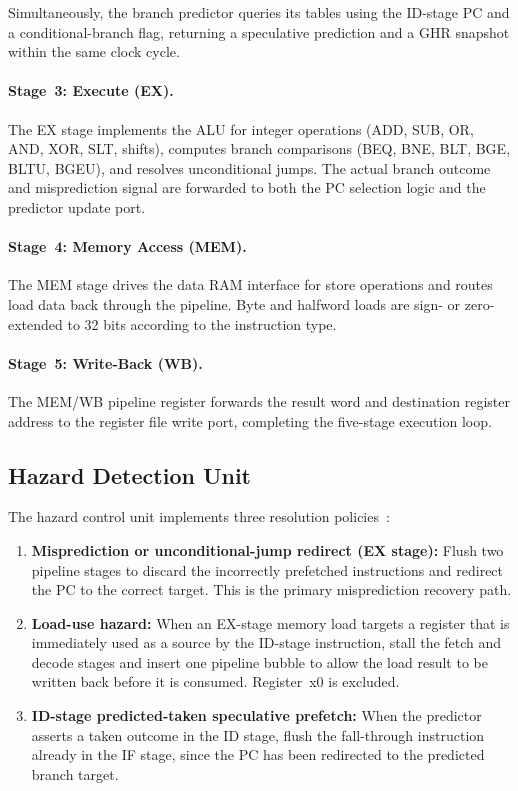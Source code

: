 \documentclass[12pt,a4paper]{article}
\begin{document}
Simultaneously, the branch predictor queries its tables using the ID-stage PC and
a conditional-branch flag, returning a speculative prediction and a GHR snapshot
within the same clock cycle.

\paragraph{Stage~3: Execute (EX).}
The EX stage implements the ALU for integer operations (ADD, SUB, OR, AND,
XOR, SLT, shifts), computes branch comparisons (BEQ, BNE, BLT, BGE, BLTU, BGEU),
and resolves unconditional jumps. The actual branch outcome and misprediction
signal are forwarded to both the PC selection logic and the predictor update port.

\paragraph{Stage~4: Memory Access (MEM).}
The MEM stage drives the data RAM interface for store operations and routes load
data back through the pipeline. Byte and halfword loads are sign- or
zero-extended to 32 bits according to the instruction type.

\paragraph{Stage~5: Write-Back (WB).}
The MEM/WB pipeline register forwards the result word and destination register
address to the register file write port, completing the five-stage execution loop.

\subsection{Hazard Detection Unit}
\label{sec:hazard}

The hazard control unit implements three resolution
policies~\cite{hennessy2017quantitative}:

\begin{enumerate}
  \item \textbf{Misprediction or unconditional-jump redirect (EX stage):}
    Flush two pipeline stages to discard the incorrectly prefetched instructions
    and redirect the PC to the correct target. This is the primary
    misprediction recovery path.

  \item \textbf{Load-use hazard:}
    When an EX-stage memory load targets a register that is immediately used
    as a source by the ID-stage instruction, stall the fetch and decode stages
    and insert one pipeline bubble to allow the load result to be written back
    before it is consumed. Register~x0 is excluded.

  \item \textbf{ID-stage predicted-taken speculative prefetch:}
    When the predictor asserts a taken outcome in the ID stage, flush the
    fall-through instruction already in the IF stage, since the PC has been
    redirected to the predicted branch target.
\end{enumerate}
\end{document}
